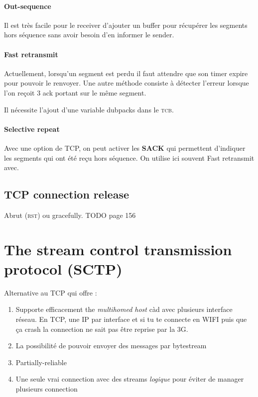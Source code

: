 \documentclass{report}
\begin{document}
\paragraph{Out-sequence}
Il est très facile pour le receiver d'ajouter un buffer pour récupérer les 
segments hors séquence sans avoir besoin d'en informer le sender.

\paragraph{Fast retransmit}
Actuellement, lorsqu'un segment est perdu il faut attendre que son timer expire
pour pouvoir le renvoyer. Une autre méthode consiste à détecter l'erreur lorsque
l'on reçoit 3 ack portant sur le même segment.

Il nécessite l'ajout d'une variable dubpacks dans le \textsc{tcb}.

\paragraph{Selective repeat}
Avec une option de TCP, on peut activer les \textbf{SACK} qui permettent d'indiquer 
les segments qui ont été reçu hors séquence. On utilise ici souvent Fast retransmit avec.

\subsection{TCP connection release}
Abrut (\textsc{rst}) ou gracefully.
TODO page 156

\section{The stream control transmission protocol (SCTP) }
Alternative au TCP qui offre :
\begin{enumerate}
    \item Supporte efficacement the \textit{multihomed host} càd avec plusieurs interface réseau. En TCP, une IP par interface et si tu te connecte en WIFI puis que ça
        crash la connection ne sait pas être reprise par la 3G.
    \item La possibilité de pouvoir envoyer des messages par bytestream
    \item Partially-reliable
    \item Une seule vrai connection avec des streams \textit{logique} pour éviter de manager
        plusieurs connection
\end{enumerate}
\end{document}
